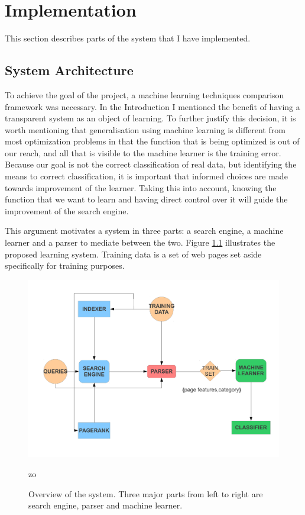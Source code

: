 \documentclass[12pt,notitlepage,twoside]{scrreprt}
\begin{document}
\chapter{Implementation}
This section describes parts of the system that I have implemented.

\section{System Architecture}

To achieve the goal of the project, a machine learning techniques comparison
framework was necessary. In the Introduction I mentioned the benefit of having
a transparent system as an object of learning. To further justify this
decision, it is worth mentioning that  generalisation using machine learning is
different from most optimization problems in that the function that is being
optimized is out of our reach, and all that is visible to the machine learner
is the training error. Because our goal is not the correct classification of
real data, but identifying the means to correct classification, it is important
that informed choices are made towards improvement of the learner. Taking this
into account, knowing the function that we want to learn and having direct
control over it  will guide the improvement of the search engine. 

This argument motivates a system in three parts: a search engine, a machine
learner and a parser to mediate between the two.  Figure \ref{overview}
illustrates the proposed learning system. Training data is a set of web pages
set aside specifically for training purposes.  

\begin{figure}
\centering
\includegraphics[scale=0.5]{figs/overview.pdf}
\caption{Overview of the system. Three major parts from left to right are search engine,
parser and machine learner.}
zo\label{overview}

\end{figure}
\end{document}

